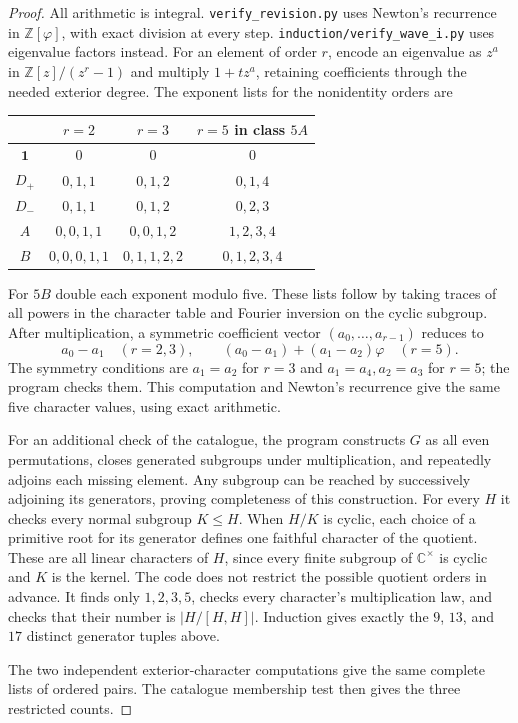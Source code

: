 \documentclass[11pt,a4paper]{article}
\begin{document}
\begin{proof}
All arithmetic is integral. \texttt{verify\_revision.py} uses Newton's recurrence in $\mathbb Z[\varphi]$, with exact division at every step. \texttt{induction/verify\_wave\_i.py} uses eigenvalue factors instead. For an element of order $r$, encode an eigenvalue as $z^a$ in $\mathbb Z[z]/(z^r-1)$ and multiply $1+t z^a$, retaining coefficients through the needed exterior degree. The exponent lists for the nonidentity orders are
\begin{center}\small
\begin{tabular}{c|ccc}
&$r=2$&$r=3$&$r=5$ in class $5A$\\\hline
$\mathbf1$&$0$&$0$&$0$\\
$D_+$&$0,1,1$&$0,1,2$&$0,1,4$\\
$D_-$&$0,1,1$&$0,1,2$&$0,2,3$\\
$A$&$0,0,1,1$&$0,0,1,2$&$1,2,3,4$\\
$B$&$0,0,0,1,1$&$0,1,1,2,2$&$0,1,2,3,4$
\end{tabular}\end{center}
For $5B$ double each exponent modulo five. These lists follow by taking traces of all powers in the character table and Fourier inversion on the cyclic subgroup. After multiplication, a symmetric coefficient vector $(a_0,\ldots,a_{r-1})$ reduces to
\[
a_0-a_1\quad(r=2,3),\qquad
(a_0-a_1)+(a_1-a_2)\varphi\quad(r=5).
\]
The symmetry conditions are $a_1=a_2$ for $r=3$ and $a_1=a_4,a_2=a_3$ for $r=5$; the program checks them. This computation and Newton's recurrence give the same five character values, using exact arithmetic.

For an additional check of the catalogue, the program constructs $G$ as all even permutations, closes generated subgroups under multiplication, and repeatedly adjoins each missing element. Any subgroup can be reached by successively adjoining its generators, proving completeness of this construction. For every $H$ it checks every normal subgroup $K\leq H$. When $H/K$ is cyclic, each choice of a primitive root for its generator defines one faithful character of the quotient. These are all linear characters of $H$, since every finite subgroup of $\mathbb C^\times$ is cyclic and $K$ is the kernel. The code does not restrict the possible quotient orders in advance. It finds only $1,2,3,5$, checks every character's multiplication law, and checks that their number is $|H/[H,H]|$. Induction gives exactly the $9$, $13$, and $17$ distinct generator tuples above.

The two independent exterior-character computations give the same complete lists of ordered pairs. The catalogue membership test then gives the three restricted counts.
\end{proof}
\end{document}
